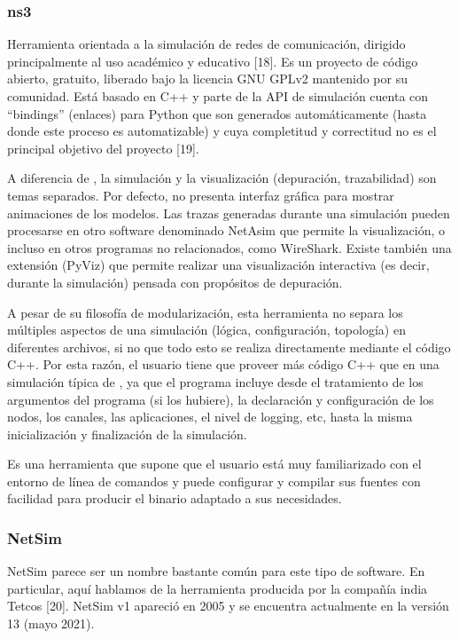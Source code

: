 \documentclass[]{article}
\begin{document}
\subsubsection{ns3}

Herramienta orientada a la simulación de redes de comunicación, dirigido
principalmente al uso académico y educativo [18]. Es un proyecto de código
abierto, gratuito, liberado bajo la licencia GNU GPLv2 mantenido por su
comunidad. Está basado en C++ y parte de la API de simulación cuenta con
``bindings'' (enlaces) para Python que son generados automáticamente (hasta
donde este proceso es automatizable) y cuya completitud y correctitud no es el
principal objetivo del proyecto [19].

A diferencia de \omnetpp{}, la simulación y la visualización (depuración,
trazabilidad) son temas separados. Por defecto, no presenta interfaz gráfica
para mostrar animaciones de los modelos. Las trazas generadas durante una
simulación pueden procesarse en otro software denominado NetAsim que permite la
visualización, o incluso en otros programas no relacionados, como WireShark.
Existe también una extensión (PyViz) que permite realizar una visualización
interactiva (es decir, durante la simulación) pensada con propósitos de
depuración.

A pesar de su filosofía de modularización, esta herramienta no separa los
múltiples aspectos de una simulación (lógica, configuración, topología) en
diferentes archivos, si no que todo esto se realiza directamente mediante el
código C++. Por esta razón, el usuario tiene que proveer más código C++ que en
una simulación típica de \omnetpp{}, ya que el programa incluye desde el
tratamiento de los argumentos del programa (si los hubiere), la declaración y
configuración de los nodos, los canales, las aplicaciones, el nivel de logging,
etc, hasta la misma inicialización y finalización de la simulación.

Es una herramienta que supone que el usuario está muy familiarizado con el
entorno de línea de comandos y puede configurar y compilar sus fuentes con
facilidad para producir el binario adaptado a sus necesidades.

\subsubsection{NetSim}

NetSim parece ser un nombre bastante común para este tipo de software. En
particular, aquí hablamos de la herramienta producida por la compañía india
Tetcos [20]. NetSim v1 apareció en 2005 y se encuentra actualmente en la
versión 13 (mayo 2021).
\end{document}
